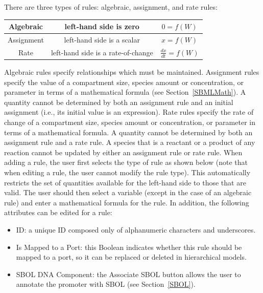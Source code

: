 \documentclass[titlepage,11pt]{article}
\begin{document}
\noindent
There are three types of rules: algebraic, assignment, and rate rules:
\begin{center}
\begin{tabular}{|c|c|c|}
\hline
Algebraic  & left-hand side is zero             & $0 = f(W)$ \\ \hline
Assignment & left-hand side is a scalar         & $x = f(W)$ \\ \hline
Rate       & left-hand side is a rate-of-change & $\frac{dx}{dt} = f(W)$ 
\\ \hline
\end{tabular}
\end{center}

\noindent
Algebraic rules specify relationships which must be maintained.  Assignment rules specify the value of a compartment size, species amount or concentration, or parameter in terms of a mathematical formula (see Section~\ref{SBMLMath}).  A quantity cannot be determined by both an assignment rule and an initial assignment (i.e., its initial value is an expression).  Rate rules specify the rate of change of a compartment size, species amount or concentration, or parameter in terms of a mathematical formula.  A quantity cannot be determined by both an assignment rule and a rate rule.  A species that is a reactant or a product of any reaction cannot be updated by either an assignment rule or rate rule.  When adding a rule, the user first selects the type of rule as shown below (note that when editing a rule, the user cannot modify the rule type).  
This automatically restricts the set of quantities available for the left-hand side to those that are valid.  The user should then select a variable (except in the case of an algebraic rule) and enter a mathematical formula for the rule.  In addition, the following attributes can be edited for a rule:
\begin{itemize}
\item ID: a unique ID composed only of alphanumeric characters and underscores.
\item Is Mapped to a Port: this Boolean indicates whether this rule should be mapped to a port, so it can be replaced or deleted in hierarchical models.
\item SBOL DNA Component: the Associate SBOL button allows the user to annotate the promoter with SBOL (see Section~\ref{SBOL}).
\end{itemize}
\end{document}
